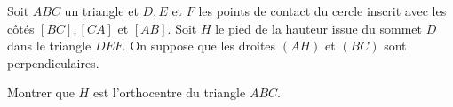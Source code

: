 Soit $ABC$ un triangle et $D, E$ et $F$ les points de contact du cercle inscrit avec les côtés $[BC], [CA]$ et $[AB]$. Soit $H$ le pied de la hauteur issue du sommet $D$ dans le triangle $DEF$. On suppose que les droites $(AH)$ et $(BC)$ sont perpendiculaires.

Montrer que $H$ est l'orthocentre du triangle $ABC$.